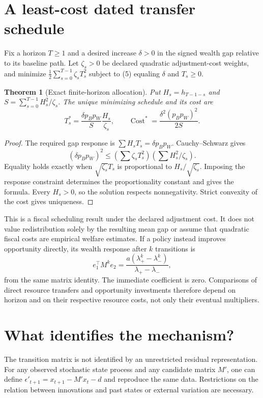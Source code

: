 \documentclass[11pt,a4paper]{article}
\newtheorem{theorem}{Theorem}[section]
\theoremstyle{remark}
\begin{document}
\section{A least-cost dated transfer schedule}
Fix a horizon $T\ge1$ and a desired increase $\delta>0$ in the signed wealth gap relative to its baseline path. Let $\zeta_s>0$ be declared quadratic adjustment-cost weights, and minimize $\frac12\sum_{s=0}^{T-1}\zeta_sT_s^2$ subject to (5) equaling $\delta$ and $T_s\ge0$.

\begin{theorem}[Exact finite-horizon allocation]
Put $H_s=h_{T-1-s}$ and $S=\sum_{s=0}^{T-1}H_s^2/\zeta_s$. The unique minimizing schedule and its cost are
\[
 T_s^*=\frac{\delta p_Bp_W}{S}\frac{H_s}{\zeta_s},\qquad
 \operatorname{Cost}^*=\frac{\delta^2(p_Bp_W)^2}{2S}.
\]
\end{theorem}
\begin{proof}
The required gap response is $\sum H_sT_s=\delta p_Bp_W$. Cauchy--Schwarz gives
\[
 (\delta p_Bp_W)^2\le
 \left(\sum\zeta_sT_s^2\right)\left(\sum H_s^2/\zeta_s\right).
\]
Equality holds exactly when $\sqrt{\zeta_s}T_s$ is proportional to $H_s/\sqrt{\zeta_s}$. Imposing the response constraint determines the proportionality constant and gives the formula. Every $H_s>0$, so the solution respects nonnegativity. Strict convexity of the cost gives uniqueness.
\end{proof}
This is a fiscal scheduling result under the declared adjustment cost. It does not value redistribution solely by the resulting mean gap or assume that quadratic fiscal costs are empirical welfare estimates. If a policy instead improves opportunity directly, its wealth response after $k$ transitions is
\[
 e_1^\top M^ke_2=
 \frac{a(\lambda_+^k-\lambda_-^k)}{\lambda_+-\lambda_-},
\]
from the same matrix identity. The immediate coefficient is zero. Comparisons of direct resource transfers and opportunity investments therefore depend on horizon and on their respective resource costs, not only their eventual multipliers.

\section{What identifies the mechanism?}
The transition matrix is not identified by an unrestricted residual representation. For any observed stochastic state process and any candidate matrix $M'$, one can define $\epsilon'_{t+1}=x_{t+1}-M'x_t-d$ and reproduce the same data. Restrictions on the relation between innovations and past states or external variation are necessary.
\end{document}
